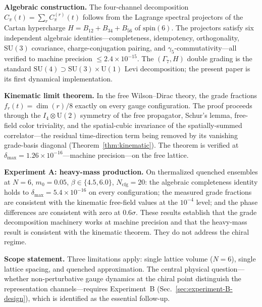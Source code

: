 \documentclass[12pt]{article}
\theoremstyle{definition}
\theoremstyle{remark}
\newcommand{\su}{\mathrm{SU}}           %
\newcommand{\GaSeven}{\Gamma_7}                      %
\newcommand{\Ncfg}{N_{\mathrm{cfg}}}                  %
\begin{document}
	\noindent\textbf{Algebraic construction.}  The four-channel decomposition
	$C_\pi(t) = \sum_r C_\pi^{(r)}(t)$ follows from the Lagrange spectral
	projectors of the Cartan hypercharge $H = B_{12}+B_{34}+B_{56}$ of
	$\mathrm{spin}(6)$.  The projectors satisfy six independent algebraic
	identities---completeness, idempotency, orthogonality, $\su(3)$ covariance,
	charge-conjugation pairing, and $\gamma_5$-commutativity---all verified to
	machine precision $\leq 2.4\times10^{-15}$.  The $(\GaSeven, H)$ double
	grading is the standard $\su(4)\supset\su(3)\times\mathrm{U}(1)$ Levi
	decomposition; the present paper is its first dynamical implementation.
	
	\noindent\textbf{Kinematic limit theorem.}  In the free Wilson--Dirac theory,
	the grade fractions $f_r(t) = \dim(r)/8$ exactly on every gauge
	configuration.  The proof proceeds through the $I_4\otimes\mathrm{U}(2)$
	symmetry of the free propagator, Schur's lemma, free-field color triviality,
	and the spatial-cubic invariance of the spatially-summed correlator---the
	residual time-direction term being removed by its vanishing grade-basis
	diagonal (Theorem~\ref{thm:kinematic}).  The theorem is verified
	at $\delta_{\max} = 1.26\times10^{-16}$---machine precision---on the free
	lattice.
	
	\noindent\textbf{Experiment A: heavy-mass production.}  On thermalized
	quenched ensembles at $N=6$, $m_0=0.05$, $\beta\in\{4.5,6.0\}$,
	$\Ncfg=20$: the algebraic completeness identity holds to
	$\delta_{\max}=5.4\times10^{-16}$ on every configuration; the measured
	grade fractions are consistent with the kinematic free-field values at the
	$10^{-4}$ level; and the phase differences are consistent with zero at
	$0.6\sigma$.  These results establish that the grade decomposition machinery
	works at machine precision and that the heavy-mass result is consistent with
	the kinematic theorem.  They do not address the chiral regime.
	
	\noindent\textbf{Scope statement.}  Three limitations apply: single lattice
	volume ($N=6$), single lattice spacing, and quenched approximation.  The
	central physical question---whether non-perturbative gauge dynamics at the
	chiral point distinguish the representation channels---requires Experiment~B
	(Sec.~\ref{sec:experiment-B-design}), which is identified as the essential
	follow-up.
	
\end{document}
